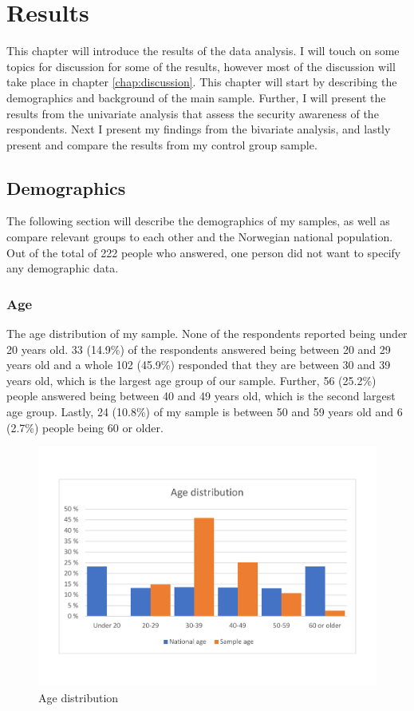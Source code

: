 \chapter{Results}
\label{chap:results}
This chapter will introduce the results of the data analysis. I will touch on some topics for discussion for some of the results, however most of the discussion will take place in chapter \ref{chap:discussion}. This chapter will start by describing the demographics and background of the main sample. Further, I will present the results from the univariate analysis that assess the security awareness of the respondents. Next I present my findings from the bivariate analysis, and lastly present and compare the results from my control group sample. 

\section{Demographics}

The following section will describe the demographics of my samples, as well as compare relevant groups to each other and the Norwegian national population. Out of the total of 222 people who answered, one person did not want to specify any demographic data. 

\subsection{Age}
The age distribution of my sample. None of the respondents reported being under 20 years old. 33 (14.9\%) of the respondents answered being between 20 and 29 years old and a whole 102 (45.9\%) responded that they are between 30 and 39 years old, which is the largest age group of our sample. Further, 56 (25.2\%) people answered being between 40 and 49 years old, which is the second largest age group. Lastly, 24 (10.8\%) of my sample is between 50 and 59 years old and 6 (2.7\%) people being 60 or older. 
\begin{figure}[!h]
    \centering
    \includegraphics[scale=0.40]{figures/diagrams/age_ssb.pdf}
    \caption{Age distribution}
    \label{fig:age}
\end{figure}

